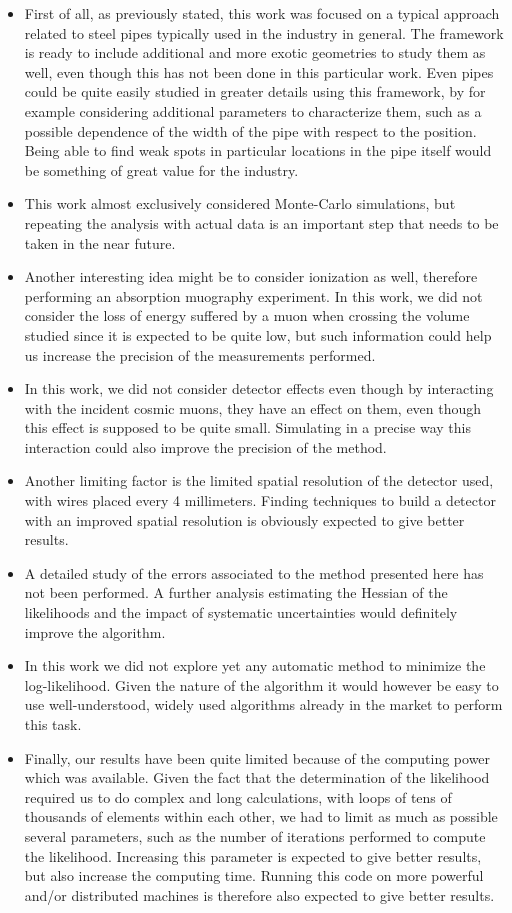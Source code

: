 \documentclass[a4paper, 11pt, twoside, openright]{report}
\begin{document}
\begin{itemize}
    \item First of all, as previously stated, this work was focused on a typical approach related to steel pipes typically used in the industry in general. The framework is ready to include additional and more exotic geometries to study them as well, even though this has not been done in this particular work. Even pipes could be quite easily studied in greater details using this framework, by for example considering additional parameters to characterize them, such as a possible dependence of the width of the pipe with respect to the position. Being able to find weak spots in particular locations in the pipe itself would be something of great value for the industry.
    \item This work almost exclusively considered Monte-Carlo simulations, but repeating the analysis with actual data is an important step that needs to be taken in the near future.
    \item Another interesting idea might be to consider ionization as well, therefore performing an absorption muography experiment. In this work, we did not consider the loss of energy suffered by a muon when crossing the volume studied since it is expected to be quite low, but such information could help us increase the precision of the measurements performed.
    \item In this work, we did not consider detector effects even though by interacting with the incident cosmic muons, they have an effect on them, even though this effect is supposed to be quite small. Simulating in a precise way this interaction could also improve the precision of the method.
    \item Another limiting factor is the limited spatial resolution of the detector used, with wires placed every 4 millimeters. Finding techniques to build a detector with an improved spatial resolution is obviously expected to give better results.
    \item A detailed study of the errors associated to the method presented here has not been performed. A further analysis estimating the Hessian of the likelihoods and the impact of systematic uncertainties would definitely improve the algorithm. 
    \item In this work we did not explore yet any automatic method to minimize the log-likelihood. Given the nature of the algorithm it would however be easy to use well-understood, widely used algorithms already in the market to perform this task.
    \item Finally, our results have been quite limited because of the computing power which was available. Given the fact that the determination of the likelihood required us to do complex and long calculations, with loops of tens of thousands of elements within each other, we had to limit as much as possible several parameters, such as the number of iterations performed to compute the likelihood. Increasing this parameter is expected to give better results, but also increase the computing time. Running this code on more powerful and/or distributed machines is therefore also expected to give better results.
\end{itemize}
\end{document}
